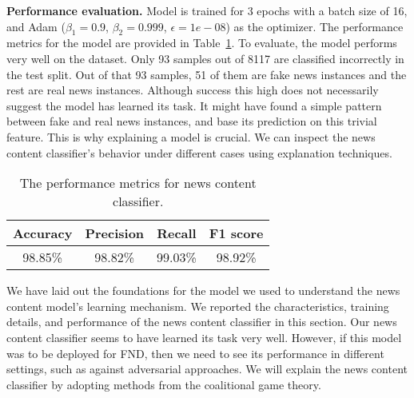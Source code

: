 \textbf{Performance evaluation.} Model is trained for 3 epochs with a batch size of 16, and Adam ($\beta_1=0.9$, $\beta_2=0.999$, $\epsilon=1e-08$) as the optimizer. The performance metrics for the model are provided in Table~\ref{tab:newsContentModelPerformanceMetrics}. To evaluate, the model performs very well on the dataset. Only 93 samples out of 8117 are classified incorrectly in the test split. Out of that 93 samples, 51 of them are fake news instances and the rest are real news instances. Although success this high does not necessarily suggest the model has learned its task. It might have found a simple pattern between fake and real news instances, and base its prediction on this trivial feature. This is why explaining a model is crucial. We can inspect the news content classifier's behavior under different cases using explanation techniques.\\
\begin{table}
    \centering
    \begin{tabular}{c | c | c | c}
        \textbf{Accuracy} & \textbf{Precision} & \textbf{Recall} & \textbf{F1 score} \\
        \hline
        98.85\%           & 98.82\%            & 99.03\%         & 98.92\%           \\
    \end{tabular}
    \caption[The performance metrics for news content classifier.]{The performance metrics for news content classifier.}
    \label{tab:newsContentModelPerformanceMetrics}
\end{table}
We have laid out the foundations for the model we used to understand the news content model's learning mechanism. We reported the characteristics, training details, and performance of the news content classifier in this section. Our news content classifier seems to have learned its task very well. However, if this model was to be deployed for FND, then we need to see its performance in different settings, such as against adversarial approaches. We will explain the news content classifier by adopting methods from the coalitional game theory.

